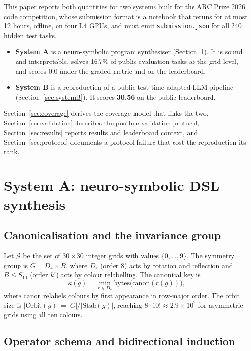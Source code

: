 \documentclass[11pt,a4paper]{article}
\begin{document}
This paper reports both quantities for two systems built for the ARC Prize 2026 code competition, whose submission format is a notebook that reruns for at most 12 hours, offline, on four L4 GPUs, and must emit \texttt{submission.json} for all 240 hidden test tasks.

\begin{itemize}
\item \textbf{System A} is a neuro-symbolic program synthesiser (Section~\ref{sec:systemA}). It is sound and interpretable, solves 16.7\% of public evaluation tasks at the grid level, and scores 0.0 under the graded metric and on the leaderboard.
\item \textbf{System B} is a reproduction of a public test-time-adapted LLM pipeline (Section~\ref{sec:systemB}). It scores \textbf{30.56} on the public leaderboard.
\end{itemize}

Section~\ref{sec:coverage} derives the coverage model that links the two, Section~\ref{sec:validation} describes the posthoc validation protocol, Section~\ref{sec:results} reports results and leaderboard context, and Section~\ref{sec:protocol} documents a protocol failure that cost the reproduction its rank.

\section{System A: neuro-symbolic DSL synthesis}
\label{sec:systemA}

\subsection{Canonicalisation and the invariance group}

Let $\mathcal{G}$ be the set of $30\times30$ integer grids with values $\{0,\dots,9\}$. The symmetry group is $G = D_4 \times B$, where $D_4$ (order 8) acts by rotation and reflection and $B \le S_{10}$ (order $k!$) acts by colour relabelling. The canonical key is
\[
\kappa(g) = \min_{r \in D_4} \mathrm{bytes}\bigl(\mathrm{canon}(r(g))\bigr),
\]
where $\mathrm{canon}$ relabels colours by first appearance in row-major order. The orbit size is $|\mathrm{Orbit}(g)| = |G| / |\mathrm{Stab}(g)|$, reaching $8\cdot 10! \approx 2.9\times10^{7}$ for asymmetric grids using all ten colours.

\subsection{Operator schema and bidirectional induction}
\end{document}
